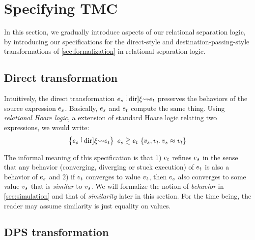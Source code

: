 \section{Specifying TMC}
\label{sec:specification}

In this section, we gradually introduce aspects of our relational separation logic, by introducing our specifications for the direct-style and destination-passing-style transformations of \cref{sec:formalization} in relational separation logic.

\subsection{Direct transformation}

Intuitively, the direct transformation $\datalangExpr_s \tmcDir{\datalangRenaming} \datalangExpr_t$ preserves the behaviors of the source expression $\datalangExpr_s$.
Basically, $\datalangExpr_s$ and $\datalangExpr_t$ compute the same thing.
Using \emph{relational Hoare logic}, a extension of standard Hoare logic relating two expressions, we would write:
\[
    \iSimvHoare{
        \datalangExpr_s \tmcDir{\datalangRenaming} \datalangExpr_t
    }{
        \datalangVal_s, \datalangVal_t \ldotp
        \datalangVal_s \iSimilar \datalangVal_t
    }{
        \datalangExpr_s
    }{
        \datalangExpr_t
    }
\]

The informal meaning of this specification is that 1) $\datalangExpr_t$ refines $\datalangExpr_s$ in the sense that any behavior (converging, diverging or stuck execution) of $\datalangExpr_t$ is also a behavior of $\datalangExpr_s$ and 2) if $\datalangExpr_t$ converges to value $\datalangVal_t$, then $\datalangExpr_s$ also converges to some value $\datalangVal_s$ that is \emph{similar} to $\datalangVal_s$.
We will formalize the notion of \emph{behavior} in \cref{sec:simulation} and that of \emph{similarity} later in this section.
For the time being, the reader may assume similarity is just equality on values.

\subsection{DPS transformation}

